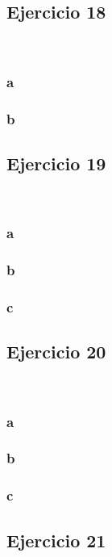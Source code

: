\documentclass{article}
\begin{document}
\subsection*{Ejercicio 18}

\

\subsubsection*{a}

\subsubsection*{b}

\subsection*{Ejercicio 19}

\

\subsubsection*{a}

\subsubsection*{b}

\subsubsection*{c}

\subsection*{Ejercicio 20}

\

\subsubsection*{a}

\subsubsection*{b}

\subsubsection*{c}

\subsection*{Ejercicio 21}
\end{document}
